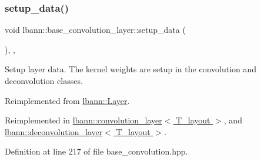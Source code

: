 \subsubsection{\texorpdfstring{setup\+\_\+data()}{setup\_data()}}
{\footnotesize\ttfamily void lbann\+::base\+\_\+convolution\+\_\+layer\+::setup\+\_\+data (\begin{DoxyParamCaption}{ }\end{DoxyParamCaption})\hspace{0.3cm}{\ttfamily [inline]}, {\ttfamily [override]}, {\ttfamily [virtual]}}

Setup layer data. The kernel weights are setup in the convolution and deconvolution classes. 

Reimplemented from \hyperlink{classlbann_1_1Layer_a50a89f8a68762c677d48efe384676e81}{lbann\+::\+Layer}.



Reimplemented in \hyperlink{classlbann_1_1convolution__layer_ab20636b44d2b17abdb5424df54cb9c6d}{lbann\+::convolution\+\_\+layer$<$ T\+\_\+layout $>$}, and \hyperlink{classlbann_1_1deconvolution__layer_a6d891396ea1c91030cd647cc111c8c5f}{lbann\+::deconvolution\+\_\+layer$<$ T\+\_\+layout $>$}.



Definition at line 217 of file base\+\_\+convolution.\+hpp.


